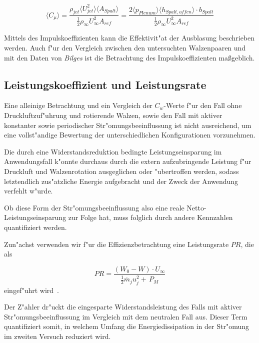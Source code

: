 	\begin{equation}
	\label{eq:momentum-coeff-oscill-final}
		\langle{C_{\mu}}\rangle = \frac{\rho_{jet}\langle{U^2_{jet}}\rangle \langle{A_{Spalt}}\rangle} {\frac{1}{2}\rho_{\infty}U^2_{\infty}A_{ref}} = \frac{2\langle{p_{Plenum}}\rangle \langle{h_{Spalt,offen}}\rangle \cdot b_{Spalt}} {\frac{1}{2}\rho_{\infty}U^2_{\infty}A_{ref}}
	\end{equation}

Mittels des Impulskoeffizienten kann die Effektivit"at der Ausblasung beschrieben werden.
Auch f"ur den Vergleich zwischen den untersuchten Walzenpaaren und mit den Daten von \textit{Bilges} \cite{Bilges.2018} ist die Betrachtung des Impulskoeffizienten ma\ss{}geblich.

\subsection{Leistungskoeffizient und Leistungsrate}
Eine alleinige Betrachtung und ein Vergleich der $C_w$-Werte f"ur den Fall ohne Druckluftzuf"uhrung und rotierende Walzen, sowie den Fall mit aktiver konstanter sowie periodischer Str"omungsbeeinflussung ist nicht ausreichend, um eine vollst"andige Bewertung der unterschiedlichen Konfigurationen vorzunehmen.

Die durch eine Widerstandsreduktion bedingte Leistungseinsparung im Anwendungsfall k"onnte durchaus durch die extern aufzubringende Leistung f"ur Druckluft und Walzenrotation ausgeglichen oder "ubertroffen werden, sodass letztendlich zus"atzliche Energie aufgebracht und der Zweck der Anwendung verfehlt w"urde.

Ob diese Form der Str"omungsbeeinflussung also eine reale Netto-Leistungseinsparung zur Folge hat, muss folglich durch andere Kennzahlen quantifiziert werden.

Zun"achst verwenden wir f"ur die Effizienzbetrachtung eine Leistungsrate $PR$, die als 

\begin{equation}
	\label{eq:leistungsrate}
	PR = \frac{(W_0 - W)\cdot U_{\infty}}{\frac{1}{2} \dot{m_j} u_j^2 + \, P_M}
\end{equation}
eingef"uhrt wird~\cite{Freund.1994}.

Der Z"ahler dr"uckt die eingesparte Widerstandsleistung des Falls mit aktiver Str"omungsbeeinflussung im Vergleich mit dem neutralen Fall aus.
Dieser Term quantifiziert somit, in welchem Umfang die Energiedissipation in der Str"omung im zweiten Versuch reduziert wird.

